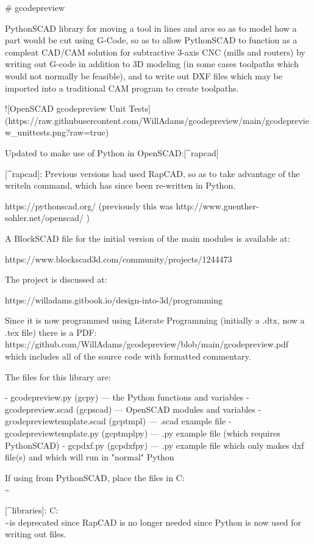 \documentclass{ltxdoc}
\begin{document}
\begin{readme}
# gcodepreview

PythonSCAD library for moving a tool in lines and arcs so as to model how a part would be cut using G-Code, so as to allow PythonSCAD to function as a compleat CAD/CAM solution for subtractive 3-axis CNC (mills and routers) by writing out G-code in addition to 3D modeling (in some cases toolpaths which would not normally be feasible), and to write out DXF files which may be imported into a traditional CAM program to create toolpaths.

![OpenSCAD gcodepreview Unit Tests](https://raw.githubusercontent.com/WillAdams/gcodepreview/main/gcodepreview_unittests.png?raw=true)

Updated to make use of Python in OpenSCAD:[^rapcad]

[^rapcad]: Previous versions had used RapCAD, so as to take advantage of the writeln command, which has since been re-written in Python.

https://pythonscad.org/ (previously this was http://www.guenther-sohler.net/openscad/ )

A BlockSCAD file for the initial version of the 
main modules is available at:

https://www.blockscad3d.com/community/projects/1244473

The project is discussed at:

https://willadams.gitbook.io/design-into-3d/programming

Since it is now programmed using Literate Programming (initially a .dtx, now a .tex file) there is a PDF: https://github.com/WillAdams/gcodepreview/blob/main/gcodepreview.pdf which includes all of the source code with formatted commentary.

The files for this library are:

 - gcodepreview.py (gcpy) --- the Python functions and variables
 - gcodepreview.scad (gcpscad) --- OpenSCAD modules and variables
 - gcodepreviewtemplate.scad (gcptmpl) --- .scad example file
 - gcodepreviewtemplate.py (gcptmplpy) --- .py example file (which requires PythonSCAD)
 - gcpdxf.py (gcpdxfpy) --- .py example file which only makes dxf file(s) and which will run in "normal" Python

If using from PythonSCAD, place the files in C:\Users\\\~\Documents\OpenSCAD\libraries [^libraries]

[^libraries]: C:\Users\\\~\Documents\RapCAD\libraries is deprecated since RapCAD is no longer needed since Python is now used for writing out files.


\end{readme}
\end{document}
